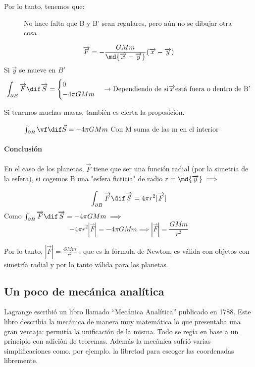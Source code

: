 Por lo tanto, tenemos que:

\begin{figure}[hbtp]
	\centering
	\caption{No hace falta que B y B' sean regulares, pero aún no se dibujar otra cosa}
\end{figure}
$$\overrightarrow F = - \frac{GMm}{\md{\overrightarrow x - \overrightarrow y}}(\overrightarrow x - \overrightarrow y)$$
 Si $\overrightarrow y $ se mueve en $B'$
 $$\int_{\partial B} \overrightarrow F \dif \overrightarrow S =
 \begin{cases}
 0\\
 -4\pi GMm\\
 \end{cases}
 \rightarrow \text{Dependiendo de si} \overrightarrow x \text{está fuera o dentro de B'}$$

 Si tenemos muchas masas, también es cierta la proposición.\\

\begin{figure}[hbtp]
	\centering
	\caption{$\int_{\partial B} \vf \dif \vec{S} = -4\pi GMm $ Con M suma de las m en el interior}
\end{figure}

\paragraph{Conclusión}
En el caso de los planetas, $\overrightarrow F$ tiene que ser una función radial (por la simetría de la esfera), si cogemos B una "esfera ficticia" de radio $r = \md{\overrightarrow y} \implies$
\begin{figure}[hbtp]
	\centering
\end{figure}
$$\int_{\partial B} \overrightarrow F \dif \overrightarrow S = 4 \pi r^2 |\overrightarrow F|$$
Como $\int_{\partial B} \overrightarrow F \dif \overrightarrow S = -4\pi GMm  \implies$
$$ - 4\pi r^2 |\overrightarrow F| = -4\pi GMm \implies |\overrightarrow F| = \frac{GMm}{r^2}$$

Por lo tanto, $|\overrightarrow F| = \frac{GMm}{r^2}$ , que es la fórmula de Newton, es válida con objetos con simetría radial y por lo tanto válida para los planetas.\\


\subsection{Un poco de mecánica analítica}
Lagrange escribió un libro llamado ``Mecánica Analítica'' publicado en 1788. Este libro describía la mecánica de manera muy matemática lo que presentaba una gran ventaja: permitía la unificación de la misma. Todo se regía en base a un principio con adición de teoremas. Además la mecánica sufrió varias simplificaciones como. por ejemplo. la libretad para escoger las coordenadas libremente.

